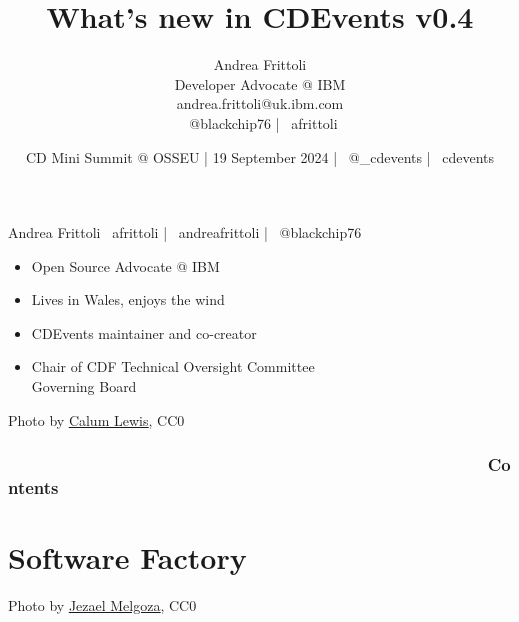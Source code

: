 \documentclass[aspectratio=169,11pt,hyperref={colorlinks=true}]{beamer}
\title{What’s new in CDEvents v0.4}
\date[19 September 2024]{CD Mini Summit @ OSSEU | 19 September 2024 | \faTwitter ~@\_cdevents | \faGithub ~cdevents}
\author[Andrea Frittoli]{%
  Andrea Frittoli \\
  Developer Advocate @ IBM\\
  andrea.frittoli@uk.ibm.com \\
  \faTwitter ~@blackchip76 | \faGithub ~afrittoli\\
}
\begin{document}
\begin{frame}
\titlepage{}
\end{frame}

\begin{speakerframe}{Andrea Frittoli}%
  {%
  \faGithub ~afrittoli | \faLinkedin ~andreafrittoli | \faTwitter ~@blackchip76
  }%
  {%
  \begin{itemize}
    \item{Open Source Advocate @ IBM}
    \item{Lives in Wales, enjoys the wind}
    \item{CDEvents maintainer and co-creator}
    \item{Chair of CDF Technical Oversight Committee \\ Governing Board}
  \end{itemize}
  }%
\end{speakerframe}

\begin{lpicrblack}{%
  Photo by \href{https://unsplash.com/@calumlewis}{\underline{Calum Lewis}}, CC0
  }%
  {%
  \tableofcontents
  }%
  {}
  \frametitle{~~~~~~~~~~~~~~~~~~~~~~~~~~~~~~~~~~~~~~~~~~~~~~~~~~~Contents}
\end{lpicrblack}

\section[Software Factory]{Software Factory}

\begin{sectionwithpiclargecentral}{Photo by \href{https://unsplash.com/@jezar}{\underline{Jezael Melgoza}}, CC0}
\end{sectionwithpiclargecentral}
\end{document}
